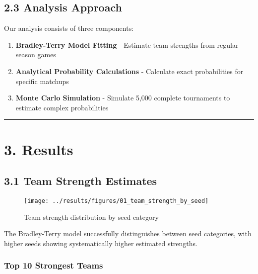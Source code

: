 \documentclass[
]{article}
\providecommand{\tightlist}{%
  \setlength{\itemsep}{0pt}\setlength{\parskip}{0pt}}
\begin{document}
\subsection{2.3 Analysis Approach}\label{analysis-approach}

Our analysis consists of three components:

\begin{enumerate}
\def\labelenumi{\arabic{enumi}.}
\tightlist
\item
  \textbf{Bradley-Terry Model Fitting} - Estimate team strengths from
  regular season games
\item
  \textbf{Analytical Probability Calculations} - Calculate exact
  probabilities for specific matchups
\item
  \textbf{Monte Carlo Simulation} - Simulate 5,000 complete tournaments
  to estimate complex probabilities
\end{enumerate}

\begin{center}\rule{0.5\linewidth}{0.5pt}\end{center}

\section{3. Results}\label{results}

\subsection{3.1 Team Strength Estimates}\label{team-strength-estimates}

\begin{figure}

{\centering \texttt{[image: ../results/figures/01\_team\_strength\_by\_seed]} 

}

\caption{Team strength distribution by seed category}\label{fig:team-strength-plot}
\end{figure}

The Bradley-Terry model successfully distinguishes between seed
categories, with higher seeds showing systematically higher estimated
strengths.

\subsubsection{Top 10 Strongest Teams}\label{top-10-strongest-teams}
\end{document}
